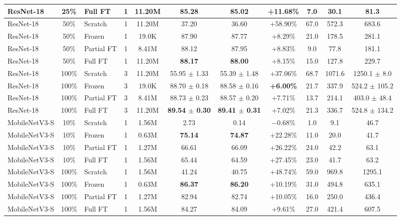 \documentclass[sigconf,nonacm]{acmart}
\begin{document}
\begin{table}[t]
{\begin{tabular}{lc l c c c c c c c c}
    ResNet-18 & 25\% & Full FT    & 1 & 11.20M & 85.28 & 85.02 & +11.68\% & 7.0  & 30.1  & 81.3 \\
    \midrule
    ResNet-18 & 50\% & Scratch    & 1 & 11.20M & 37.20 & 36.60 & +58.90\% & 67.0 & 572.3 & 683.6 \\
    ResNet-18 & 50\% & Frozen     & 1 & 19.0K  & 87.90 & 87.77 & +8.29\%  & 21.0 & 178.5 & 281.1 \\
    ResNet-18 & 50\% & Partial FT & 1 & 8.41M  & 88.12 & 87.95 & +8.83\%  & 9.0  & 77.8  & 181.1 \\
    ResNet-18 & 50\% & Full FT    & 1 & 11.20M & \textbf{88.17} & \textbf{88.00} & +8.15\%  & 15.0 & 127.8 & 229.7 \\
    \midrule
    ResNet-18 & 100\% & Scratch    & 3 & 11.20M & 55.95 $\pm$ 1.33 & 55.39 $\pm$ 1.48 & +37.06\% & 68.7 & 1071.6 & 1250.1 $\pm$ 8.0 \\
    ResNet-18 & 100\% & Frozen     & 3 & 19.0K  & 88.70 $\pm$ 0.18 & 88.58 $\pm$ 0.16 & \textbf{+6.00\%}  & 21.7 & 337.9  & 524.2 $\pm$ 105.2 \\
    ResNet-18 & 100\% & Partial FT & 3 & 8.41M  & 88.73 $\pm$ 0.23 & 88.57 $\pm$ 0.20 & +7.71\%  & 13.7 & 214.1  & 403.0 $\pm$ 48.4 \\
    ResNet-18 & 100\% & Full FT    & 3 & 11.20M & \textbf{89.54 $\pm$ 0.30} & \textbf{89.41 $\pm$ 0.31} & +7.02\%  & 21.3 & 336.7  & 524.8 $\pm$ 134.2 \\
    \midrule
    MobileNetV3-S & 10\%  & Scratch    & 1 & 1.56M & 2.73  & 0.14  & $-$0.68\% & 1.0  & 9.1   & 46.7 \\
    MobileNetV3-S & 10\%  & Frozen     & 1 & 0.63M & \textbf{75.14} & \textbf{74.87} & +22.28\% & 11.0 & 20.0  & 41.7 \\
    MobileNetV3-S & 10\%  & Partial FT & 1 & 1.27M & 66.61 & 66.09 & +26.22\% & 24.0 & 42.2  & 63.1 \\
    MobileNetV3-S & 10\%  & Full FT    & 1 & 1.56M & 65.44 & 64.59 & +27.45\% & 23.0 & 41.7  & 63.2 \\
    \midrule
    MobileNetV3-S & 100\% & Scratch    & 1 & 1.56M & 41.24 & 40.75 & +48.74\% & 59.0 & 969.8 & 1295.1 \\
    MobileNetV3-S & 100\% & Frozen     & 1 & 0.63M & \textbf{86.37} & \textbf{86.20} & +10.19\% & 31.0 & 494.8 & 635.1 \\
    MobileNetV3-S & 100\% & Partial FT & 1 & 1.27M & 82.94 & 82.74 & +10.05\% & 16.0 & 250.0 & 436.4 \\
    MobileNetV3-S & 100\% & Full FT    & 1 & 1.56M & 84.27 & 84.09 & +9.61\%  & 27.0 & 421.4 & 607.5 \\
    \bottomrule
  \end{tabular}%
  }
\end{table}
\end{document}
